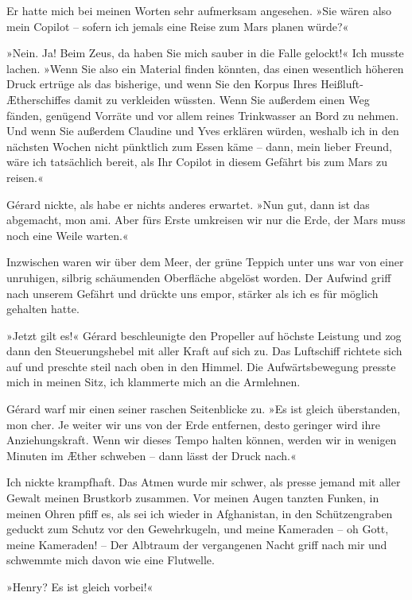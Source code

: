 Er hatte mich bei meinen Worten sehr aufmerksam angesehen. »Sie
wären also mein Copilot – sofern ich jemals eine Reise zum Mars
planen würde?«

»Nein. Ja! Beim Zeus, da haben Sie mich sauber in die Falle
gelockt!« Ich musste lachen. »Wenn Sie also ein Material finden
könnten, das einen wesentlich höheren Druck ertrüge als das
bisherige, und wenn Sie den Korpus Ihres Heißluft-Ætherschiffes
damit zu verkleiden wüssten. Wenn Sie außerdem einen Weg fänden,
genügend Vorräte und vor allem reines Trinkwasser an Bord zu
nehmen. Und wenn Sie außerdem Claudine und Yves erklären würden,
weshalb ich in den nächsten Wochen nicht pünktlich zum Essen käme –
dann, mein lieber Freund, wäre ich tatsächlich bereit, als Ihr
Copilot in diesem Gefährt bis zum Mars zu reisen.«

Gérard nickte, als habe er nichts anderes erwartet. »Nun gut, dann
ist das abgemacht, mon ami. Aber fürs Erste umkreisen wir nur die
Erde, der Mars muss noch eine Weile warten.«

\bigpar

Inzwischen waren wir über dem Meer, der grüne Teppich unter uns war
von einer unruhigen, silbrig schäumenden Oberfläche abgelöst
worden. Der Aufwind griff nach unserem Gefährt und drückte uns
empor, stärker als ich es für möglich gehalten hatte.

»Jetzt gilt es!« Gérard beschleunigte den Propeller auf höchste
Leistung und zog dann den Steuerungshebel mit aller Kraft auf sich
zu. Das Luftschiff richtete sich auf und preschte steil nach oben
in den Himmel. Die Aufwärtsbewegung presste mich in meinen Sitz,
ich klammerte mich an die Armlehnen.

Gérard warf mir einen seiner raschen Seitenblicke zu. »Es ist
gleich überstanden, mon cher. Je weiter wir uns von der Erde
entfernen, desto geringer wird ihre Anziehungskraft. Wenn wir
dieses Tempo halten können, werden wir in wenigen Minuten im Æther
schweben – dann lässt der Druck nach.«

Ich nickte krampfhaft. Das Atmen wurde mir schwer, als presse
jemand mit aller Gewalt meinen Brustkorb zusammen. Vor meinen Augen
tanzten Funken, in meinen Ohren pfiff es, als sei ich wieder in
Afghanistan, in den Schützengraben geduckt zum Schutz vor den
Gewehrkugeln, und meine Kameraden – oh Gott, meine Kameraden! – Der
Albtraum der vergangenen Nacht griff nach mir und schwemmte mich
davon wie eine Flutwelle.

»Henry? Es ist gleich vorbei!«

